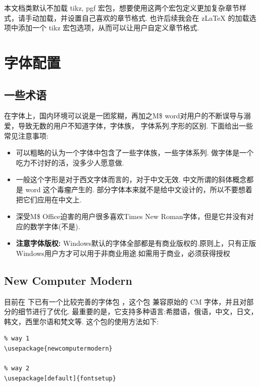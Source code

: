 \begin{remark}
本文档类默认不加载 {tikz, pgf} 宏包，想要使用这两个宏包定义更加复杂章节样式，请手动加载，并设置自己喜欢的章节格式. 
也许后续我会在 z\LaTeX{} 的加载选项中添加一个 tikz 宏包选项，从而可以让用户自定义章节格式.
\end{remark}





\clearpage
\section{字体配置}\label{font-config}
\subsection{一些术语}
在字体上，国内环境可以说是一团浆糊，再加之M\$ word对用户的不断误导与溺爱，导致无数的用户不知道字体，字体族，
字体系列,字形的区别. 下面给出一些常见注意事项:
\begin{itemize}
    \item 可以粗略的认为一个字体中包含了一些字体族，一些字体系列. 做字体是一个吃力不讨好的活，没多少人愿意做.
    \item 一般这个字形是对于西文字体而言的，对于中文无效. 中文所谓的斜体概念都是 word 这个毒瘤产生的.
      部分字体本来就不是给中文设计的，所以不要想着把它们应用在中文上.
    \item 深受M\$ Office迫害的用户很多喜欢Times New Roman字体，但是它并没有对应的数学字体(不是).
    \item \textbf{注意字体版权:} Windows默认的字体全部都是有商业版权的.原则上，只有正版Windows用户方才可以用于非商业用途.如需用于商业，必须获得授权
\end{itemize} 

\subsection{New Computer Modern}
目前在  下已有一个比较完善的字体包 ，这个包 
兼容原始的 CM 字体，并且对部分的细节进行了优化. 最重要的是，它支持多种语言:希腊语，俄语，中文，日文，韩文，西里尔语和梵文等.
这个包的使用方法如下:

\begin{verbatim}
% way 1
\usepackage{newcomputermodern}

% way 2
\usepackage[default]{fontsetup}
\end{verbatim}

